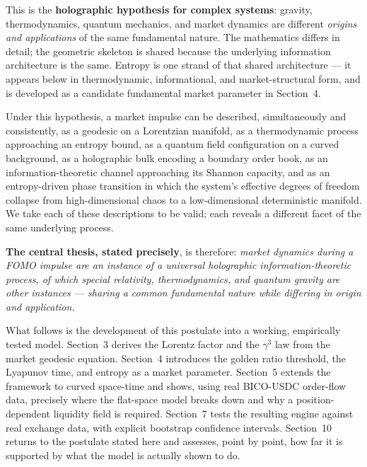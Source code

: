\documentclass[12pt,a4paper]{article}
\begin{document}
This is the \textbf{holographic hypothesis for complex systems}: gravity,
thermodynamics, quantum mechanics, and market dynamics are different
\emph{origins and applications} of the same fundamental nature. The
mathematics differs in detail; the geometric skeleton is shared because
the underlying information architecture is the same. Entropy is one strand
of that shared architecture --- it appears below in thermodynamic,
informational, and market-structural form, and is developed as a candidate
fundamental market parameter in Section~4.

Under this hypothesis, a market impulse can be described, simultaneously
and consistently, as a geodesic on a Lorentzian manifold, as a
thermodynamic process approaching an entropy bound, as a quantum field
configuration on a curved background, as a holographic bulk encoding a
boundary order book, as an information-theoretic channel approaching its
Shannon capacity, and as an entropy-driven phase transition in which the
system's effective degrees of freedom collapse from high-dimensional chaos
to a low-dimensional deterministic manifold. We take each of these
descriptions to be valid; each reveals a different facet of the same
underlying process.

\textbf{The central thesis, stated precisely}, is therefore: \emph{market
dynamics during a FOMO impulse are an instance of a universal holographic
information-theoretic process, of which special relativity,
thermodynamics, and quantum gravity are other instances --- sharing a
common fundamental nature while differing in origin and application.}

What follows is the development of this postulate into a working,
empirically tested model. Section~3 derives the Lorentz factor and the
$\gamma^3$ law from the market geodesic equation. Section~4 introduces
the golden ratio threshold, the Lyapunov time, and entropy as a market
parameter. Section~5 extends the framework to curved space-time and shows,
using real BICO-USDC order-flow data, precisely where the flat-space model
breaks down and why a position-dependent liquidity field is required.
Section~7 tests the resulting engine against real exchange data, with
explicit bootstrap confidence intervals. Section~10 returns to the
postulate stated here and assesses, point by point, how far it is
supported by what the model is actually shown to do.
\end{document}
